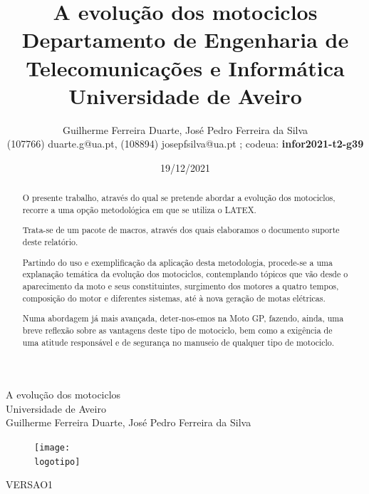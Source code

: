 \documentclass{report}
\begin{document}
%
\def\titulo{A evolução dos motociclos}
\def\data{19/12/2021}
\def\autores{Guilherme Ferreira Duarte, José Pedro Ferreira da Silva }
\def\autorescontactos{(107766) duarte.g@ua.pt, (108894) josepfsilva@ua.pt
        ; codeua:  \textbf{infor2021-t2-g39}}
\def\versao{VERSAO1}
\def\departamento{Departamento de Engenharia de Telecomunicações e Informática}
\def\empresa{Universidade de Aveiro}
\def\logotipo{ua.pdf}
%
%

\renewcommand{\contentsname}{Índice}
\begin{titlepage}

\begin{center}
%
\vspace*{50mm}
%
{\Huge \titulo}\\ 
%
\vspace{10mm}
%
{\Large \empresa}\\
%
\vspace{10mm}
%
{\LARGE \autores}\\ 
%
\vspace{30mm}
%
\begin{figure}[h]
\center
\texttt{[image: \\logotipo]}
\end{figure}
%
\vspace{30mm}
\end{center}
%
\begin{flushright}
\versao
\end{flushright}
\end{titlepage}

\title{%
{\Huge\textbf{\titulo}}\\
{\Large \departamento\\ \empresa}
}
%
\author{%
    \autores \\
    \autorescontactos
}
%
\date{\data}
%
\maketitle


\begin{abstract}
O presente trabalho, através do qual se pretende abordar a evolução dos motociclos, recorre a uma opção metodológica em que se utiliza o LATEX.

Trata-se de um pacote de macros, através dos quais elaboramos o documento suporte deste relatório.

Partindo do uso e exemplificação da aplicação desta metodologia, procede-se a uma explanação temática da evolução dos motociclos, contemplando tópicos que vão desde o aparecimento da moto e seus constituintes, surgimento dos motores a quatro tempos, composição do motor e diferentes sistemas, até à nova geração de motas elétricas.

Numa abordagem já mais avançada, deter-nos-emos na Moto GP, fazendo, ainda, uma breve reflexão sobre as vantagens deste tipo de motociclo, bem como a exigência de uma atitude responsável e de segurança no manuseio de qualquer tipo de motociclo.

\end{abstract}
\end{document}
